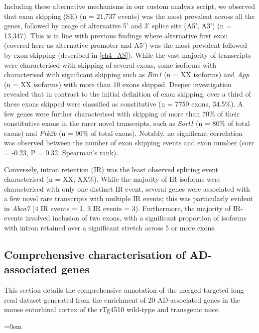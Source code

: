 Including these alternative mechanisms in our custom analysis script, we observed that exon skipping (SE) (n = 21,737 events) was the most prevalent across all the genes, followed by usage of alternative 5' and 3' splice site (A5', A3') (n = 13,347). This is in line with previous findings where alternative first exon (covered here as alternative promoter and A5') was the most prevalent followed by exon skipping (described in \cref{ch4_AS}). While the vast majority of transcripts were characterised with skipping of several exons, some isoforms with characterised with significant skipping such as \textit{Bin1} (n = XX isoforms) and \textit{App} (n = XX isoforms) with more than 10 exons skipped. Deeper investigation revealed that in contrast to the initial definition of exon skipping, over a third of these exons skipped were classified as constitutive (n = 7759 exons, 34.5\%). A few genes were further characterised with skipping of more than 70\% of their constitutive exons in the rarer novel transcripts, such as \textit{Sorl1} (n = 80\% of total exons) and \textit{Ptk2b} (n = 90\% of total exons). Notably, no significant correlation was observed between the number of exon skipping events and exon number (corr = -0.23, P = 0.32, Spearman's rank). 

Conversely, intron retention (IR) was the least observed splicing event characterised (n = XX, XX\%). While the majority of IR-isoforms were characterised with only one distinct IR event, several genes were associated with a few novel rare transcripts with multiple IR events; this was particularly evident in \textit{Abca7} (4 IR events = 1, 3 IR events = 3). Furthermore, the majority of IR-events involved inclusion of two exons, with a significant proportion of isoforms with intron retained over a significant stretch across 5 or more exons. 

\clearpage
\subsection{Comprehensive characterisation of AD-associated genes} 
This section details the comprehensive annotation of the merged targeted long-read dataset generated from the enrichment of 20 AD-associated genes in the mouse entorhinal cortex of the rTg4510 wild-type and transgenic mice. 

\vspace{1cm}
\begingroup
\parindent=0em
\localtableofcontents 
\endgroup

